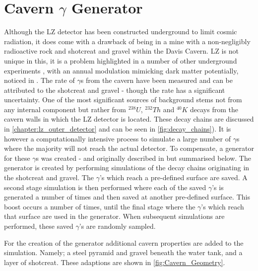 \section{Cavern $\gamma$ Generator}
\label{sec:cavern_gamma_generator}

\par
Although the LZ detector has been constructed underground to limit cosmic radiation, it does come with a drawback of being in a mine with a non-negligibly radioactive rock and  shotcreat and gravel within the Davis Cavern.
LZ is not unique in this, it is a problem highlighted in a number of other underground experiments \cite{cavern_gamma_annual_modulation_CoGeNT_ref, cavern_gammas_in_Soudan_mine_ref}, with an annual modulation mimicking dark matter potentially, noticed in \cite{cavern_gamma_annual_modulation_CoGeNT_ref}.
The rate of $\gamma$s from the cavern have been measured and can be attributed to the shotcreat and gravel \cite{LZ_Gamma_Ray_Background_ref} - though the rate has a significant uncertainty.
One of the most significant sources of background stems not from any internal component but rather from $^{238}U$, $^{232}Th$ and $^{40}K$ decays from the cavern walls in which the LZ detector is located.
These decay chains are discussed in \autoref{chapter:lz_outer_detector} and can be seen in \autoref{fig:decay_chains}).
It is however a computationally intensive process to simulate a large number of $\gamma$s where the majority will not reach the actual detector.
To compensate, a generator for these $\gamma$s was created - and originally described in \cite{rg_generator_ref} but summarised below.
The generator is created by performing simulations of the decay chains originating in the shotcreat and gravel.
The $\gamma$'s which reach a pre-defined surface are saved.
A second stage simulation is then performed where each of the saved $\gamma$'s is generated a number of times and then saved at another pre-defined surface.
This boost occurs a number of times, until the final stage where the $\gamma$'s which reach that surface are used in the generator.
When subsequent simulations are performed, these saved $\gamma$'s are randomly sampled. 

\par
For the creation of the generator additional cavern properties are added to the simulation.
Namely; a steel pyramid and gravel beneath the water tank, and a layer of shotcreat.
These adaptions are shown in \autoref{fig:Cavern_Geometry}.

